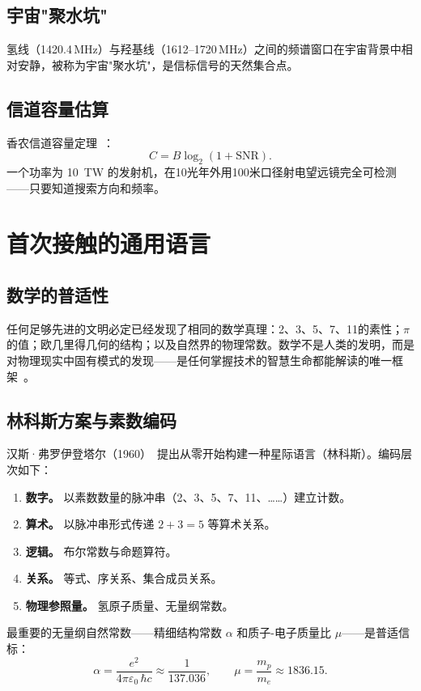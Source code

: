 \documentclass[12pt,a4paper]{article}
\begin{document}
\subsection{宇宙"聚水坑"}

氢线（1420.4\,MHz）与羟基线（1612--1720\,MHz）之间的频谱窗口在宇宙背景中相对安静，被称为宇宙"聚水坑"，是信标信号的天然集合点。

\subsection{信道容量估算}

香农信道容量定理~\citep{Shannon1948}：
\begin{equation}
  C = B\log_2\!\left(1 + \mathrm{SNR}\right).
\end{equation}
一个功率为 \SI{10}{\tera\watt} 的发射机，在10光年外用100米口径射电望远镜完全可检测——只要知道搜索方向和频率。

\section{首次接触的通用语言}

\subsection{数学的普适性}

任何足够先进的文明必定已经发现了相同的数学真理：2、3、5、7、11的素性；$\pi$ 的值；欧几里得几何的结构；以及自然界的物理常数。数学不是人类的发明，而是对物理现实中固有模式的发现——是任何掌握技术的智慧生命都能解读的唯一框架~\citep{Penrose1989}。

\subsection{林科斯方案与素数编码}

汉斯·弗罗伊登塔尔（1960）~\citep{Freudenthal1960}提出从零开始构建一种星际语言（林科斯）。编码层次如下：
\begin{enumerate}[noitemsep]
  \item \textbf{数字。} 以素数数量的脉冲串（2、3、5、7、11、……）建立计数。
  \item \textbf{算术。} 以脉冲串形式传递 $2 + 3 = 5$ 等算术关系。
  \item \textbf{逻辑。} 布尔常数与命题算符。
  \item \textbf{关系。} 等式、序关系、集合成员关系。
  \item \textbf{物理参照量。} 氢原子质量、无量纲常数。
\end{enumerate}
最重要的无量纲自然常数——精细结构常数 $\alpha$ 和质子-电子质量比 $\mu$——是普适信标：
\begin{equation}
  \alpha = \frac{e^2}{4\pi\varepsilon_0\,\hbar c} \approx \frac{1}{137.036},
  \qquad
  \mu = \frac{m_p}{m_e} \approx 1836.15.
\end{equation}
\end{document}
